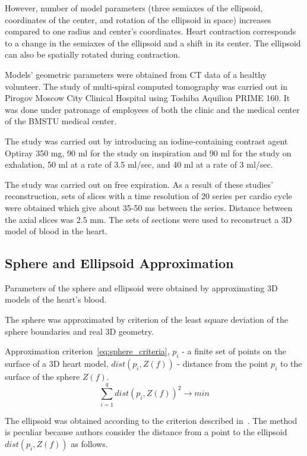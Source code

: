 \documentclass[conference]{IEEEtran}
\begin{document}
However, number of model parameters (three semiaxes of the ellipsoid, coordinates of the center, and rotation of the ellipsoid in space) increases compared to one radius and center’s coordinates.
Heart contraction corresponds to a change in the semiaxes of the ellipsoid and a shift in its center.
The ellipsoid can also be spatially rotated during contraction.

Models’ geometric parameters were obtained from CT data of a healthy volunteer.
The study of multi-spiral computed tomography was carried out in Pirogov Moscow City Clinical Hospital using Toshiba Aquilion PRIME 160.
It was done under patronage of employees of both the clinic and the medical center of the BMSTU medical center.

The study was carried out by introducing an iodine-containing contrast
agent Optiray 350 mg, 90 ml for the study on inspiration and 90 ml for the study
on exhalation, 50 ml at a rate of 3.5 ml/sec, and 40 ml at a rate of 3 ml/sec.

The study was carried out on free expiration.
As a result of these studies’ reconstruction, sets of slices with a time resolution of 20 series per cardio cycle were obtained which give about 35-50 ms between the series.
Distance between the axial slices was 2.5 mm.
The sets of sections were used to reconstruct a 3D model of blood in the heart.

\subsection{Sphere and Ellipsoid Approximation}

Parameters of the sphere and ellipsoid were obtained by approximating 3D models of the heart’s blood.

The sphere was approximated by criterion of the least square deviation of the sphere boundaries and real 3D geometry.

Approximation criterion~\ref{eq:sphere_criteria},
$p_i$ - a finite set of points on the surface of a 3D heart model,
$dist(p_i,Z(f))$ -  distance from the point $p_i$ to the surface of the sphere $Z(f)$.
\begin{equation}
    \sum_{i=1}^{q}dist(p_i,Z(f))^2 \rightarrow min
    \label{eq:sphere_criteria}
\end{equation}

The ellipsoid was obtained according to the criterion described in~\cite{Bookstein1979}.
The method is peculiar because authors consider the distance from a point to the ellipsoid $dist(p_i, Z(f))$ as follows.
\end{document}

